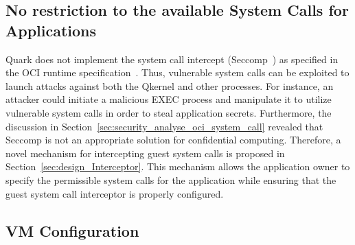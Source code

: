 
\subsection{No restriction to the available System Calls for Applications}

Quark does not implement the system call intercept (Seccomp~\cite*{seccomp}) as specified in the OCI runtime specification~\cite*{oci-runtime-spec}. Thus, vulnerable system calls can be exploited to launch attacks against both the Qkernel and other processes. For instance, an attacker could initiate a malicious EXEC process and manipulate it 
to utilize vulnerable system calls in order to steal application secrets. Furthermore, the discussion in Section~\ref{sec:security_analyse_oci_system_call} revealed that Seccomp is not an appropriate solution for confidential computing. Therefore, a novel mechanism for intercepting guest system calls is proposed in Section~\ref{sec:design_Interceptor}. This mechanism allows the 
application owner to specify the permissible system calls for the application while ensuring that the guest system call interceptor is properly configured. 




\subsection{VM Configuration}
\label{sec:VM_Misconfiguration}

